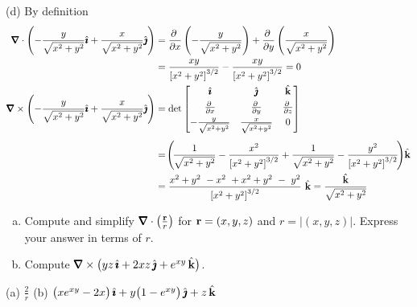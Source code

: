 \begin{solution}
(d)
By definition
\begin{align*}
\vnabla\cdot\left(-\frac{y}{\sqrt{x^2+y^2}}\hi+\frac{x}{\sqrt{x^2+y^2}}\hj\right)
&=\pdiff{}{x}\left(-\frac{y}{\sqrt{x^2+y^2}}\right)
  +\pdiff{}{y}\left(\frac{x}{\sqrt{x^2+y^2}}\right) \\
&=  \frac{xy}{{[x^2+y^2]}^{3/2}}
   - \frac{xy}{{[x^2+y^2]}^{3/2}} 
=0 \\
\vnabla\times\left(-\frac{y}{\sqrt{x^2+y^2}}\hi
                         +\frac{x}{\sqrt{x^2+y^2}}\hj\right)
&=\det\left[\begin{matrix}\hi & \hj & \hk \\[0.05in]
                  \pdiff{}{x} &
                  \pdiff{}{y} &
                  \pdiff{}{z} \\[0.05in]
                  -\frac{y}{\sqrt{x^2+y^2}} & 
                  \frac{x}{\sqrt{x^2+y^2}} & 0\end{matrix}\right] \\[0.05in]
&=\!\left(\!\frac{1}{\sqrt{x^2+y^2}} - \frac{x^2}{{[x^2+y^2]}^{3/2}}
   +\frac{1}{\sqrt{x^2+y^2}} - \frac{y^2}{{[x^2+y^2]}^{3/2}}\!\right)\!\hk
\\
&= \frac{x^2+y^2\ -x^2\ +x^2+y^2\ -\ y^2}{{[x^2+y^2]}^{3/2}}\ \hk 
= \frac{\hk}{\sqrt{x^2+y^2}}
\end{align*}
\end{solution}

\begin{question}[M317 2015A] %
\begin{enumerate}[(a)]
\item
Compute and simplify $\vnabla\cdot\big(\frac{\vr}{r}\big)$
for $\mathbf{r}=(x,y,z)$ and $r=|(x,y,z)|$. Express your answer in 
terms of $r$.

\item
Compute $\vnabla\times\big(yz\,\hi + 2xz\,\hj + e^{xy}\,\hk\big)$.
\end{enumerate}

\end{question}


\begin{answer} 
(a) $\frac{2}{r}$\qquad
(b) $\big(xe^{xy}-2x\big)\,\hat{\pmb{\imath}}+y\big(1-e^{xy}\big)\,\hat{\pmb{\jmath}}+z\,\hat{\mathbf{k}}$
\end{answer}

